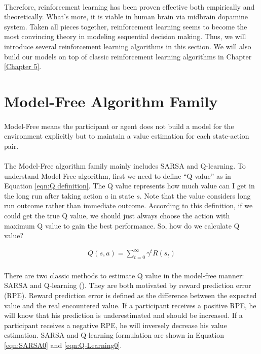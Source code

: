 \paragraph{}
Therefore, reinforcement learning has been proven effective both empirically and theoretically. What's more, it is viable in human brain via midbrain dopamine system. Taken all pieces together, reinforcement learning seems to become the most convincing theory in modeling sequential decision making. Thus, we will introduce several reinforcement learning algorithms in this section. We will also build our models on top of classic reinforcement learning algorithms in Chapter \ref{Chapter 5}. 


\section{Model-Free Algorithm Family}
\paragraph{}
Model-Free means the participant or agent does not build a model for the environment explicitly but to maintain a value estimation for each state-action pair. 

\paragraph{}
The Model-Free algorithm family mainly includes SARSA and Q-learning. To understand Model-Free algorithm, first we need to define \enquote{Q value} as in Equation \ref{eqn:Q definition}. The Q value represents how much value can I get in the long run after taking action $a$ in state $s$. Note that the value considers long run outcome rather than immediate outcome. According to this definition, if we could get the true Q value, we should just always choose the action with maximum Q value to gain the best performance. So, how do we calculate Q value?

\begin{equation}
\begin{aligned}
Q(s,a)=\sum_{t=0}^\infty{\gamma^tR(s_t)}
\end{aligned}
\label{eqn:Q definition}
\end{equation}

\paragraph{}
There are two classic methods to estimate Q value in the model-free manner: SARSA and Q-learning (\cite{daw2014algorithmic}). They are both motivated by reward prediction error (RPE). Reward prediction error is defined as the difference between the expected value and the real encountered value. If a participant receives a positive RPE, he will know that his prediction is underestimated and should be increased. If a participant receives a negative RPE, he will inversely decrease his value estimation. SARSA and Q-learning formulation are shown in Equation \ref{eqn:SARSA0} and \ref{eqn:Q-Learning0}. 
